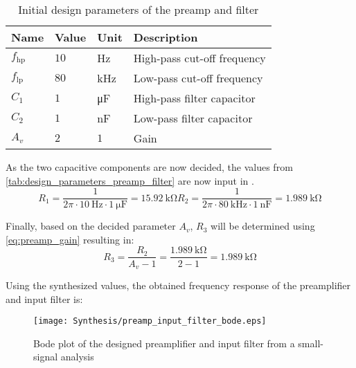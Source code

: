 \begin{table}[htbp]
	\centering
	\begin{tabular}{@{}llll@{}}
		\toprule
		\multicolumn{1}{c}{\textbf{Name}} & \textbf{Value} & \textbf{Unit} & \textbf{Description} \\ \midrule
		$f_{\mathrm{hp}}$ & $10$ & \si{\hertz} & High-pass cut-off frequency \\
		$f_{\mathrm{lp}}$ & $80$ & \si{\kilo\hertz} & Low-pass cut-off frequency \\
		$C_{\mathrm{1}}$ & $1$  & \si{\micro\farad}  & High-pass filter capacitor \\
		$C_{\mathrm{2}}$ & $1$  & \si{\nano\farad}  & Low-pass filter capacitor  \\
		$A_{v}$  & $2$  & $1$   & Gain                       \\ \bottomrule
	\end{tabular}
	\caption{Initial design parameters of the preamp and filter}
	\label{tab:design_parameters_preamp_filter}
\end{table}
As the two capacitive components are now decided, the values from \autoref{tab:design_parameters_preamp_filter} are now input in .
\begin{subequations} \label{eq:preamp_cut-off_synth}
	\begin{equation} \label{eq:preamp_cut-off_synth_a}
		R_{1} = \frac{1}{2\pi \cdot \SI{10}{\hertz} \cdot \SI{1}{\micro\farad}} = \SI{15.92}{\kilo\ohm}
	\end{equation}
	\begin{equation} \label{eq:preamp_cut-off_synth_b}
		R_{2} = \frac{1}{2\pi \cdot \SI{80}{\kilo\hertz} \cdot \SI{1}{\nano\farad}} = \SI{1.989}{\kilo\ohm}
	\end{equation}
\end{subequations}

Finally, based on the decided parameter $A_{v}$, $R_{3}$ will be determined using \autoref{eq:preamp_gain} resulting in:
\begin{equation} \label{eq:preamp_filter_synth_r3}
	R_{3} = \frac{R_{2}}{A_{v} - 1} = \frac{\SI{1.989}{\kilo\ohm}}{2 - 1} = \SI{1.989}{\kilo\ohm}
\end{equation}

Using the synthesized values, the obtained frequency response of the preamplifier and input filter is:

\begin{figure}[H]
	\centering
	\texttt{[image: Synthesis/preamp\_input\_filter\_bode.eps]}
	\caption{Bode plot of the designed preamplifier and input filter from a small-signal analysis}
	\label{fig:preamp_input_filter_bode}
\end{figure}

